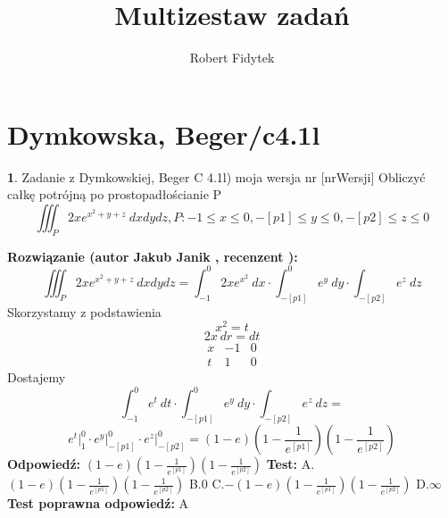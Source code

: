 \documentclass[12pt, a4paper]{article}
\title{Multizestaw zadań}
\author{Robert Fidytek}
\date{}
\theoremstyle{definition} %
\newtheorem{zad}{}
\newcommand{\kategoria}[1]{\section{#1}} %
\newcommand{\zadStart}[1]{\begin{zad}#1\newline} %
\newcommand{\zadStop}{\end{zad}}   %
\newcommand{\rozwStart}[2]{\noindent \textbf{Rozwiązanie (autor #1 , recenzent #2): }\newline} %
\newcommand{\rozwStop}{\newline}                                            %
\newcommand{\odpStart}{\noindent \textbf{Odpowiedź:}\newline}    %
\newcommand{\odpStop}{\newline}                                             %
\newcommand{\testStart}{\noindent \textbf{Test:}\newline} %
\newcommand{\testStop}{\newline} %
\newcommand{\kluczStart}{\noindent \textbf{Test poprawna odpowiedź:}\newline} %
\newcommand{\kluczStop}{\newline} %
\begin{document}
\maketitle


\kategoria{Dymkowska, Beger/c4.1l}
\zadStart{Zadanie z Dymkowskiej, Beger C 4.1l) moja wersja nr [nrWersji]}
Obliczyć całkę potrójną po prostopadłościanie P $$\iiint_P 2xe^{x^2+y+z}\ dxdydz, P: -1 \leq x \leq 0, -[p1] \leq y \leq 0, -[p2] \leq z \leq 0$$
\zadStop
\rozwStart{Jakub Janik}{}
$$\iiint_P 2xe^{x^2+y+z}\ dxdydz=\int_{-1}^0 2xe^{x^2}\ dx\cdot\int_{-[p1]}^0e^y\ dy\cdot\int_{-[p2]}e^z\ dz$$
Skorzystamy z podstawienia$$x^2=t$$ 
$$ 2x\ dr=dt$$
\begin{displaymath}
\left.\begin{array}{c|c|c}
x & -1 & 0 \\ \hline
t & 1 & 0
\end{array}\right.
\end{displaymath}
Dostajemy
$$\int_{-1}^0 e^{t}\ dt\cdot\int_{-[p1]}^0e^y\ dy\cdot\int_{-[p2]}e^z\ dz=$$
$$e^t\Big|_1^0\cdot e^y\Big|_{-[p1]}^0\cdot e^z\Big|_{-[p2]}^0=(1-e)(1-\frac{1}{e^{[p1]}})(1-\frac{1}{e^{[p2]}})$$
\rozwStop
\odpStart
$(1-e)(1-\frac{1}{e^{[p1]}})(1-\frac{1}{e^{[p2]}})$
\odpStop
\testStart
A.$(1-e)(1-\frac{1}{e^{[p1]}})(1-\frac{1}{e^{[p2]}})$
B.$0$
C.$-(1-e)(1-\frac{1}{e^{[p1]}})(1-\frac{1}{e^{[p2]}})$
D.$\infty$
\testStop
\kluczStart
A
\kluczStop
\end{document}
